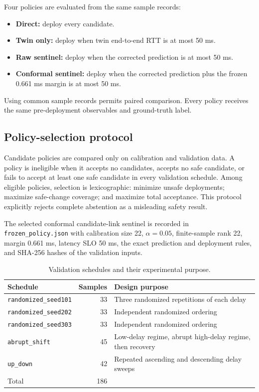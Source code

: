 Four policies are evaluated from the same sample records:
\begin{itemize}
\item \textbf{Direct:} deploy every candidate.
\item \textbf{Twin only:} deploy when twin end-to-end RTT is at most 50 ms.
\item \textbf{Raw sentinel:} deploy when the corrected prediction is at most 50 ms.
\item \textbf{Conformal sentinel:} deploy when the corrected prediction plus the frozen 0.661 ms margin is at most 50 ms.
\end{itemize}
Using common sample records permits paired comparison. Every policy receives the same pre-deployment observables and ground-truth label.

\subsection{Policy-selection protocol}

Candidate policies are compared only on calibration and validation data. A policy is ineligible when it accepts no candidates, accepts no safe candidate, or fails to accept at least one safe candidate in every validation schedule. Among eligible policies, selection is lexicographic: minimize unsafe deployments; maximize safe-change coverage; and maximize total acceptance. This protocol explicitly rejects complete abstention as a misleading safety result.

The selected conformal candidate-link sentinel is recorded in \texttt{frozen\_policy.json} with calibration size 22, $\alpha=0.05$, finite-sample rank 22, margin 0.661 ms, latency SLO 50 ms, the exact prediction and deployment rules, and SHA-256 hashes of the validation inputs.

\begin{table}[t]
\caption{Validation schedules and their experimental purpose.}
\label{tab:schedules}
\centering
\scriptsize
\begin{tabularx}{\textwidth}{l r X}
\toprule
Schedule & Samples & Design purpose\\
\midrule
\texttt{randomized\_seed101} & 33 & Three randomized repetitions of each delay\\
\texttt{randomized\_seed202} & 33 & Independent randomized ordering\\
\texttt{randomized\_seed303} & 33 & Independent randomized ordering\\
\texttt{abrupt\_shift} & 45 & Low-delay regime, abrupt high-delay regime, then recovery\\
\texttt{up\_down} & 42 & Repeated ascending and descending delay sweeps\\
\midrule
Total & 186 & \\
\bottomrule
\end{tabularx}
\end{table}

